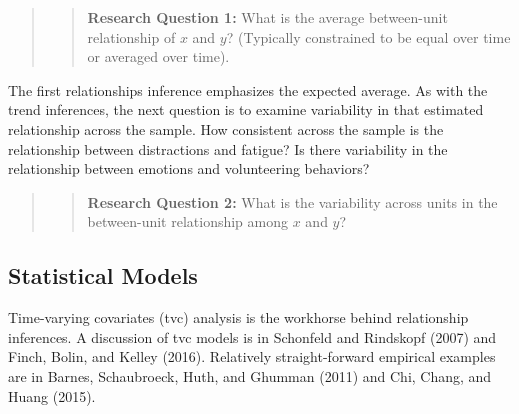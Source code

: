 \documentclass[english,,man]{apa6}
\theoremstyle{definition}
\theoremstyle{definition}
\theoremstyle{definition}
\theoremstyle{remark}
\begin{document}
\begin{quote}
\begin{quote}
\textbf{Research Question 1:} What is the average between-unit
relationship of \(x\) and \(y\)? (Typically constrained to be equal over
time or averaged over time).
\end{quote}
\end{quote}

The first relationships inference emphasizes the expected average. As
with the trend inferences, the next question is to examine variability
in that estimated relationship across the sample. How consistent across
the sample is the relationship between distractions and fatigue? Is
there variability in the relationship between emotions and volunteering
behaviors?

\begin{quote}
\begin{quote}
\textbf{Research Question 2:} What is the variability across units in
the between-unit relationship among \(x\) and \(y\)?
\end{quote}
\end{quote}

\hypertarget{statistical-models-1}{%
\subsection{Statistical Models}\label{statistical-models-1}}

Time-varying covariates (tvc) analysis is the workhorse behind
relationship inferences. A discussion of tvc models is in Schonfeld and
Rindskopf (2007) and Finch, Bolin, and Kelley (2016). Relatively
straight-forward empirical examples are in Barnes, Schaubroeck, Huth,
and Ghumman (2011) and Chi, Chang, and Huang (2015).
\end{document}
